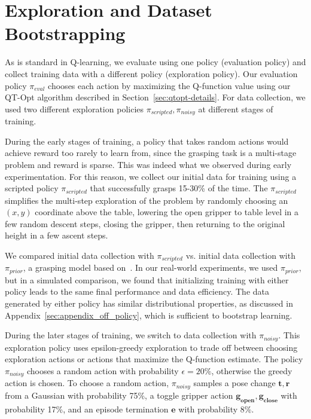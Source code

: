 \documentclass{article}
\begin{document}
\section{Exploration and Dataset Bootstrapping}
\label{sec:appendix_exploration}
As is standard in Q-learning, we evaluate using one policy (evaluation policy) and collect training data with a different policy (exploration policy). Our evaluation policy $\pi_{eval}$ chooses each action by maximizing the Q-function value using our QT-Opt algorithm described in Section~\ref{sec:qtopt-details}. For data collection, we used two different exploration policies $\pi_{scripted}, \pi_{noisy}$ at different stages of training.

During the early stages of training, a policy that takes random actions would achieve reward too rarely to learn from, since the grasping task is a multi-stage problem and reward is sparse. This was indeed what we observed during early experimentation. For this reason, we collect our initial data for training using a scripted policy
\(\pi_{scripted}\) that successfully grasps 15-30\% of the time. The \(\pi_{scripted}\) simplifies the multi-step exploration of the problem by randomly choosing an $(x,y)$ coordinate above the table, lowering the open gripper to table level in a few random descent steps, closing the gripper, then returning to the original height in a few ascent steps.

We compared initial data collection with \(\pi_{scripted}\) vs. initial data collection with \(\pi_{prior}\), a grasping model based on~\citet{levine16}. In our real-world experiments, we used \(\pi_{prior}\), but in a simulated comparison, we found that initializing training with either policy leads to the same final performance and data efficiency. The data generated by either policy has similar distributional properties, as discussed in Appendix~\ref{sec:appendix_off_policy}, which is sufficient to bootstrap learning.

During the later stages of training, we switch to data collection with \(\pi_{noisy}\). This exploration policy uses epsilon-greedy exploration to trade off between choosing exploration actions or actions that maximize the Q-function estimate. The policy \(\pi_{noisy}\) chooses a random action with probability $\epsilon=20\%$, otherwise the greedy action is chosen. To choose a random action, \(\pi_{noisy}\) samples a pose change $\mathbf{t}, \mathbf{r}$ from a Gaussian with probability 75\%, a toggle gripper action $\mathbf{g_\text{open}}, \mathbf{g_\text{close}}$ with probability 17\%, and an episode termination $\mathbf{e}$ with probability 8\%.
\end{document}
